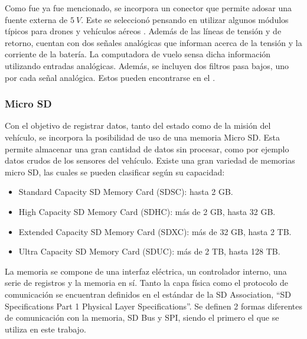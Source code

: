 
Como fue ya fue mencionado, se incorpora un conector que permite adosar una fuente externa de $5 \ V$. Este se seleccionó pensando en utilizar algunos módulos típicos para drones y vehículos aéreos \cite{HolybroPM02PowerModule}. Además de las líneas de tensión y de retorno, cuentan con dos señales analógicas que informan acerca de la tensión y la corriente de la batería. La computadora de vuelo sensa dicha información utilizando entradas analógicas. Además, se incluyen dos filtros pasa bajos, uno por cada señal analógica. Estos pueden encontrarse en el .

\subsubsection{Micro SD}

Con el objetivo de registrar datos, tanto del estado como de la misión del vehículo, se incorpora la posibilidad de uso de una memoria Micro SD. Esta permite almacenar una gran cantidad de datos sin procesar, como por ejemplo datos crudos de los sensores del vehículo. Existe una gran variedad de memorias micro SD, las cuales se pueden clasificar según su capacidad:

\begin{itemize}
    \item Standard Capacity SD Memory Card (SDSC): hasta 2 GB.
    \item High Capacity SD Memory Card (SDHC): más de 2 GB, hasta 32 GB.
    \item Extended Capacity SD Memory Card (SDXC): más de 32 GB, hasta 2 TB.
    \item Ultra Capacity SD Memory Card (SDUC): más de 2 TB, hasta 128 TB.
\end{itemize}


La memoria se compone de una interfaz eléctrica, un controlador interno, una serie de registros y la memoria en sí. Tanto la capa física como el protocolo de comunicación se encuentran definidos en el estándar de la SD Association, ``SD Specifications Part 1 Physical Layer Specifications''. Se definen 2 formas diferentes de comunicación con la memoria, SD Bus y SPI, siendo el primero el que se utiliza en este trabajo.

